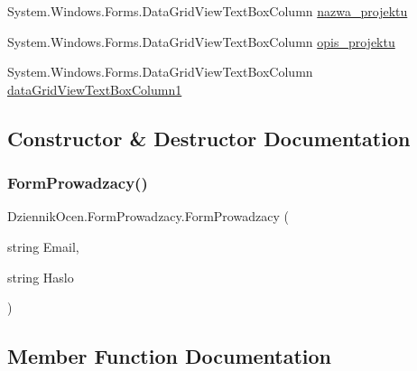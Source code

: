 \begin{DoxyCompactItemize}
\item 
System.\+Windows.\+Forms.\+Data\+Grid\+View\+Text\+Box\+Column \hyperlink{class_dziennik_ocen_1_1_form_prowadzacy_aa207a32efffe15f7ad829033a0a4d098}{nazwa\+\_\+projektu}
\item 
System.\+Windows.\+Forms.\+Data\+Grid\+View\+Text\+Box\+Column \hyperlink{class_dziennik_ocen_1_1_form_prowadzacy_ad49d1111a2fb6a998d55323e56dd5fe1}{opis\+\_\+projektu}
\item 
System.\+Windows.\+Forms.\+Data\+Grid\+View\+Text\+Box\+Column \hyperlink{class_dziennik_ocen_1_1_form_prowadzacy_a025edc876e60aa441df53b8a249f532e}{data\+Grid\+View\+Text\+Box\+Column1}
\end{DoxyCompactItemize}


\subsection{Constructor \& Destructor Documentation}
\mbox{\label{class_dziennik_ocen_1_1_form_prowadzacy_a3b383a27c47250980feb63495b1e06a6}} 
\subsubsection{\texorpdfstring{Form\+Prowadzacy()}{FormProwadzacy()}}
{\footnotesize\ttfamily Dziennik\+Ocen.\+Form\+Prowadzacy.\+Form\+Prowadzacy (\begin{DoxyParamCaption}\item[{string}]{Email,  }\item[{string}]{Haslo }\end{DoxyParamCaption})\hspace{0.3cm}{\ttfamily [inline]}}



\subsection{Member Function Documentation}
\mbox{\label{class_dziennik_ocen_1_1_form_prowadzacy_adcbaca064b616975dc51a2893d0304bd}} 
